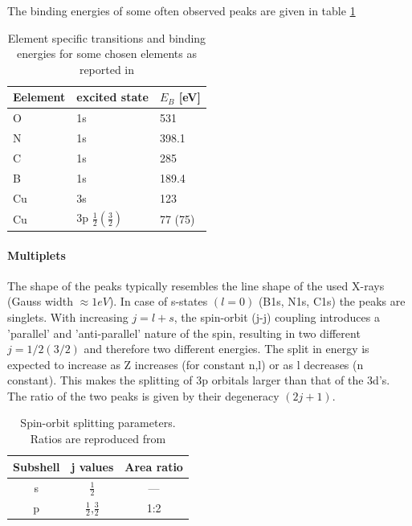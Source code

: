 The  binding energies of some often observed peaks are given in table \ref{tab:XPS-intensities}
\begin{table}\centering
 \caption{Element specific transitions and binding energies for some chosen elements as reported in \cite{wanger_handbook_1979}}
 \begin{tabular}{lll}
  Eelement & excited state & $E_B$ [eV]\\ \hline 
  O & 1s & 531\\
  N & 1s & 398.1\\
  C & 1s & 285\\
  B & 1s & 189.4 \\
  Cu & 3s & 123\\
  Cu & 3p $\frac{1}{2} (\frac{3}{2})$ & 77 (75)\\
 \end{tabular}
\label{tab:XPS-intensities}
\end{table}

\paragraph{Multiplets}
The shape of the peaks typically resembles the line shape of the used X-rays (Gauss width $\approx 1eV$). In case of s-states $(l=0)$ (B1s, N1s, C1s) the peaks are singlets. With increasing $j=l+s$, the spin-orbit (j-j) coupling introduces a 'parallel' and 'anti-parallel' nature of the spin, resulting in two different $j=1/2(3/2)$ and therefore two different energies. The split in energy is expected to increase as Z increases (for constant n,l) or as l decreases (n constant). This makes the splitting of 3p orbitals larger than that of the 3d's. The ratio of the two peaks is given by their degeneracy $(2j+1)$.\cite[113]{Riviere_90}
\begin{table}
\caption{Spin-orbit splitting parameters. Ratios are reproduced from \cite{Riviere_90}}
\centering
 \begin{tabular}{ccc}
 Subshell & j values & Area ratio \\ \hline
 s & $\frac{1}{2}$ & --- \\
 p & $\frac{1}{2}$,$\frac{3}{2}$ & 1:2 \\
 \end{tabular}
\end{table}

